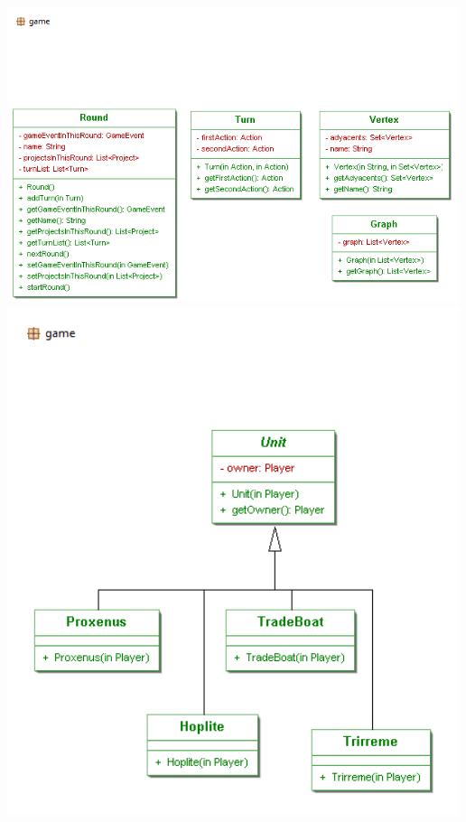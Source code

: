 \documentclass[11 pt]{book}
\begin{document}
\begin{center}
		    \includegraphics[width=500px]{design-uml/iteration3/game-round-turn-graph-vertex.png}
		    \includegraphics[width=500px]{design-uml/iteration3/game-units.png}

\end{center}
\end{document}
